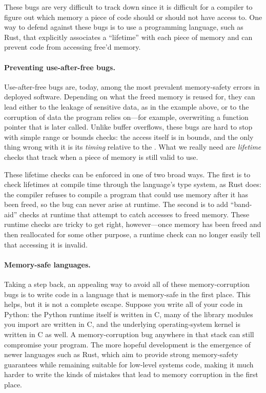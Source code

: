 These bugs are very difficult to track down since it is difficult
for a compiler to figure out which memory a piece of code should
or should not have access to.
One way to defend against these bugs is to use a programming language,
such as Rust, that explicitly associates a ``lifetime'' with each piece
of memory and can prevent code from accessing free'd memory.

\paragraph{Preventing use-after-free bugs.}
Use-after-free bugs are, today, among the most prevalent memory-safety
errors in deployed software. Depending on what the freed memory is
reused for, they can lead either to the leakage of sensitive data, as in
the example above, or to the corruption of data the program relies
on---for example, overwriting a function pointer that is later called.
Unlike buffer overflows, these bugs are hard to stop with simple range or
bounds checks: the access itself is in bounds, and the only thing wrong
with it is its \emph{timing} relative to the . What we really
need are \emph{lifetime} checks that track when a piece of memory is
still valid to use.

These lifetime checks can be enforced in one of two broad ways. The first
is to check lifetimes at compile time through the language's type system,
as Rust does: the compiler refuses to compile a program that could use
memory after it has been freed, so the bug can never arise at runtime.
The second is to add ``band-aid'' checks at runtime that attempt to catch
accesses to freed memory. These runtime checks are tricky to get right,
however---once memory has been freed and then reallocated for some other
purpose, a runtime check can no longer easily tell that accessing it is
invalid.

\paragraph{Memory-safe languages.}
Taking a step back, an appealing way to avoid all of these
memory-corruption bugs is to write code in a language that is memory-safe
in the first place. This helps, but it is not a complete escape. Suppose
you write all of your code in Python: the Python runtime itself is
written in C, many of the library modules you import are written in C,
and the underlying operating-system kernel is written in C as well. A
memory-corruption bug anywhere in that stack can still compromise your
program. The more hopeful development is the emergence of newer languages
such as Rust, which aim to provide strong memory-safety guarantees while
remaining suitable for low-level systems code, making it much harder to
write the kinds of mistakes that lead to memory corruption in the first
place.

